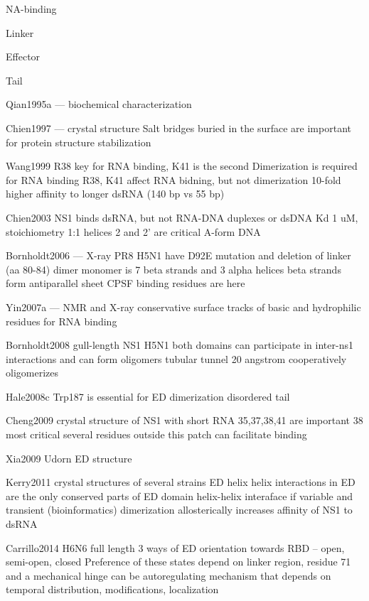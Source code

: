 NA-binding
		
		Linker
		
		Effector
		
		Tail
		
		Qian1995a --- biochemical characterization
		
		Chien1997 --- crystal structure
		Salt bridges buried in the surface are important for protein structure stabilization
		
		
		Wang1999
		R38 key for RNA binding, K41 is the second
		Dimerization is required for RNA binding
		R38, K41 affect RNA bidning, but not dimerization
		10-fold higher affinity to longer dsRNA (140 bp vs 55 bp)
		
		Chien2003
		NS1 binds dsRNA, but not RNA-DNA duplexes or dsDNA
		Kd 1 uM, stoichiometry 1:1
		helices 2 and 2' are critical
		A-form DNA
		
		Bornholdt2006 --- X-ray PR8
		H5N1 have D92E mutation and deletion of linker (aa 80-84)
		dimer
		monomer is 7 beta strands and 3 alpha helices
		beta strands form antiparallel sheet
		CPSF binding residues are here
		
		Yin2007a --- NMR and X-ray
		conservative surface tracks of basic and hydrophilic residues for RNA binding
		
		Bornholdt2008
		gull-length NS1 H5N1
		both domains can participate in inter-ns1 interactions and can form oligomers
		tubular tunnel
		20 angstrom
		cooperatively oligomerizes
		
		Hale2008c
		Trp187 is essential for ED dimerization
		disordered tail
		
		Cheng2009
		crystal structure of NS1 with short RNA
		35,37,38,41 are important
		38 most critical
		several residues outside this patch can facilitate binding
		
		Xia2009
		Udorn ED structure
		
		Kerry2011
		crystal structures of several strains ED
		helix helix interactions in ED are the only conserved parts of ED domain
		helix-helix interaface if variable and transient (bioinformatics)
		dimerization allosterically increases affinity of NS1 to dsRNA
		
		Carrillo2014
		H6N6 full length
		3 ways of ED orientation towards RBD -- open, semi-open, closed
		Preference of these states depend on linker region, residue 71 and a mechanical hinge
		can be autoregulating mechanism that depends on temporal distribution, modifications, localization